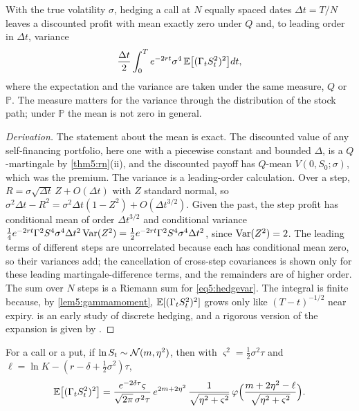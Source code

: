 \begin{chapterrefs}
\begin{proposition}\label{prop5:discrete}
With the true volatility $\sigma$, hedging a call at $N$ equally spaced dates $\Delta t=T/N$ leaves a
discounted profit with mean exactly zero under $Q$ and, to leading order in $\Delta t$, variance
\begin{equation}\label{eq5:hedgevar}
  \frac{\Delta t}2\int_0^Te^{-2rt}\sigma^4\,\mathbb{E}\bigl[(\Gamma_tS_t^2)^2\bigr]dt ,
\end{equation}
where the expectation and the variance are taken under the same measure, $Q$ or $\mathbb P$. The
measure matters for the variance through the distribution of the stock path; under $\mathbb P$ the mean
is not zero in general.
\end{proposition}

\begin{proof}[Derivation]
The statement about the mean is exact. The discounted value of any self-financing portfolio, here one with
a piecewise constant and bounded $\Delta$, is a $Q$-martingale by \cref{thm5:rn}(ii), and the discounted
payoff has $Q$-mean $V(0,S_0;\sigma)$, which was the premium. The variance is a leading-order
calculation. Over a step, $R=\sigma\sqrt{\Delta t}\,Z+O(\Delta t)$ with $Z$ standard normal, so
$\sigma^2\Delta t-R^2=\sigma^2\Delta t(1-Z^2)+O(\Delta t^{3/2})$. Given the past, the step profit has
conditional mean of order $\Delta t^{3/2}$ and conditional variance
$\tfrac14e^{-2rt}\Gamma^2S^4\sigma^4\Delta t^2\operatorname{Var}(Z^2)=\tfrac12e^{-2rt}\Gamma^2S^4\sigma^4\Delta t^2$, since
$\operatorname{Var}(Z^2)=2$. The leading terms of different steps are uncorrelated because each has conditional mean
zero, so their variances add; the cancellation of cross-step covariances is shown only for these
leading martingale-difference terms, and the remainders are of higher order. The sum over $N$ steps is
a Riemann sum for \cref{eq5:hedgevar}. The
integral is finite because, by \cref{lem5:gammamoment}, $\mathbb{E}[(\Gamma_tS_t^2)^2]$ grows only like
$(T-t)^{-1/2}$ near expiry. \textcite{boyle1980} is an early study of discrete hedging, and a rigorous
version of the expansion is given by \textcite{bertsimas2000}.
\end{proof}

\begin{lemma}\label{lem5:gammamoment}
For a call or a put, if $\ln S_t\sim\mathcal{N}(m,\eta^2)$, then with $\varsigma^2=\tfrac12\sigma^2\tau$ and
$\ell=\ln K-(r-\delta+\tfrac12\sigma^2)\tau$,
\begin{equation*}
  \mathbb{E}\bigl[(\Gamma_tS_t^2)^2\bigr]=\frac{e^{-2\delta\tau}\varsigma}{\sqrt{2\pi}\,\sigma^2\tau}\,e^{2m+2\eta^2}\,
  \frac{1}{\sqrt{\eta^2+\varsigma^2}}\,\varphi\Bigl(\frac{m+2\eta^2-\ell}{\sqrt{\eta^2+\varsigma^2}}\Bigr).
\end{equation*}
\end{lemma}


\end{chapterrefs}
